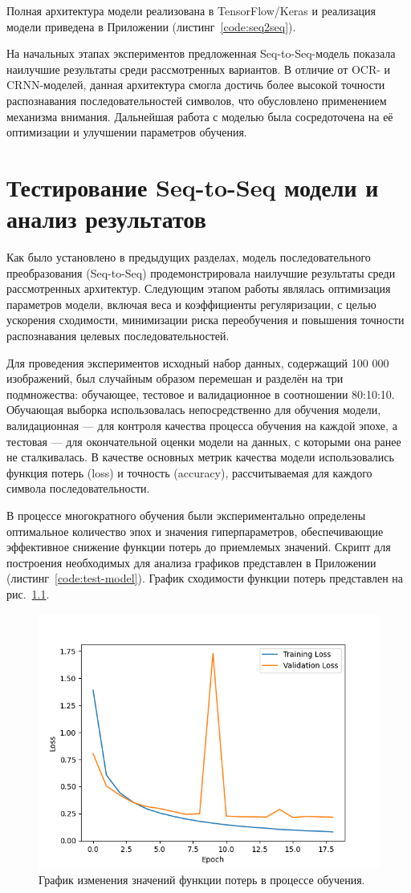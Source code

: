 \documentclass{altsu-report}
\begin{document}
Полная архитектура модели реализована в TensorFlow/Keras и реализация модели приведена в Приложении (листинг~\ref{code:seq2seq}).

На начальных этапах экспериментов предложенная Seq-to-Seq-модель показала наилучшие результаты среди рассмотренных вариантов. В отличие от OCR- и CRNN-моделей, данная архитектура смогла достичь более высокой точности распознавания последовательностей символов, что обусловлено применением механизма внимания. Дальнейшая работа с моделью была сосредоточена на её оптимизации и улучшении параметров обучения.

\chapter{Тестирование Seq-to-Seq модели и анализ результатов}

Как было установлено в предыдущих разделах, модель последовательного преобразования (Seq-to-Seq) продемонстрировала наилучшие результаты среди рассмотренных архитектур. Следующим этапом работы являлась оптимизация параметров модели, включая веса и коэффициенты регуляризации, с целью ускорения сходимости, минимизации риска переобучения и повышения точности распознавания целевых последовательностей.

Для проведения экспериментов исходный набор данных, содержащий 100 000 изображений, был случайным образом перемешан и разделён на три подмножества: обучающее, тестовое и валидационное в соотношении 80:10:10. Обучающая выборка использовалась непосредственно для обучения модели, валидационная — для контроля качества процесса обучения на каждой эпохе, а тестовая — для окончательной оценки модели на данных, с которыми она ранее не сталкивалась. В качестве основных метрик качества модели использовались функция потерь (loss) и точность (accuracy), рассчитываемая для каждого символа последовательности.

В процессе многократного обучения были экспериментально определены оптимальное количество эпох и значения гиперпараметров, обеспечивающие эффективное снижение функции потерь до приемлемых значений. Скрипт для построения необходимых для анализа графиков представлен в Приложении (листинг~\ref{code:test-model}). График сходимости функции потерь представлен на рис.~\ref{fig:loss}.

\begin{figure}[H]
    \centering
    \includegraphics[width=0.65\linewidth]{imgs/Model_loss.png}
    \caption{График изменения значений функции потерь в процессе обучения.}
    \label{fig:loss}
\end{figure}
\end{document}
